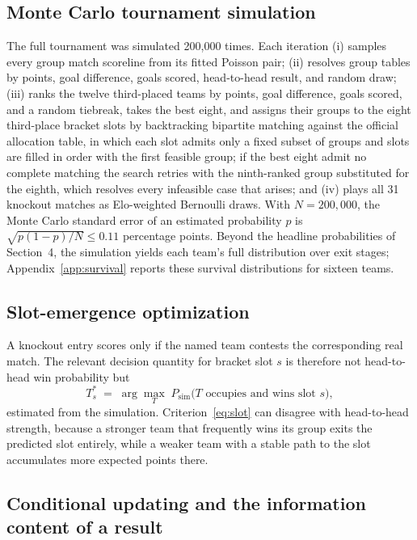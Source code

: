 \documentclass[11pt,letterpaper]{article}
\begin{document}
\subsection{Monte Carlo tournament simulation}

The full tournament was simulated 200{,}000 times. Each iteration (i) samples every group match scoreline from its fitted Poisson pair; (ii) resolves group tables by points, goal difference, goals scored, head-to-head result, and random draw; (iii) ranks the twelve third-placed teams by points, goal difference, goals scored, and a random tiebreak, takes the best eight, and assigns their groups to the eight third-place bracket slots by backtracking bipartite matching against the official allocation table, in which each slot admits only a fixed subset of groups and slots are filled in order with the first feasible group; if the best eight admit no complete matching the search retries with the ninth-ranked group substituted for the eighth, which resolves every infeasible case that arises; and (iv) plays all 31 knockout matches as Elo-weighted Bernoulli draws. With $N = 200{,}000$, the Monte Carlo standard error of an estimated probability $p$ is $\sqrt{p(1-p)/N} \le 0.11$ percentage points. Beyond the headline probabilities of Section~4, the simulation yields each team's full distribution over exit stages; Appendix~\ref{app:survival} reports these survival distributions for sixteen teams.



\subsection{Slot-emergence optimization}\label{sec:slot}

A knockout entry scores only if the named team contests the corresponding real match. The relevant decision quantity for bracket slot $s$ is therefore not head-to-head win probability but
\begin{equation}
T^\ast_s \;=\; \arg\max_T \; P_{\mathrm{sim}}\bigl(T \text{ occupies and wins slot } s\bigr),
\label{eq:slot}
\end{equation}
estimated from the simulation. Criterion~\eqref{eq:slot} can disagree with head-to-head strength, because a stronger team that frequently wins its group exits the predicted slot entirely, while a weaker team with a stable path to the slot accumulates more expected points there.

\subsection{Conditional updating and the information content of a result}\label{sec:updating}
\end{document}
